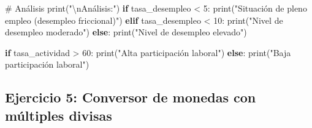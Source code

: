 \documentclass[
  doc,
  floatsintext,
  longtable,
  a4paper,
  nolmodern,
  notxfonts,
  notimes,
  12pt,
  colorlinks=true,linkcolor=blue,citecolor=blue,urlcolor=blue]{apa7}
\newenvironment{Shaded}{\begin{snugshade}}{\end{snugshade}}
\newcommand{\BuiltInTok}[1]{\textcolor[rgb]{0.00,0.23,0.31}{#1}}
\newcommand{\CharTok}[1]{\textcolor[rgb]{0.13,0.47,0.30}{#1}}
\newcommand{\CommentTok}[1]{\textcolor[rgb]{0.37,0.37,0.37}{#1}}
\newcommand{\ControlFlowTok}[1]{\textcolor[rgb]{0.00,0.23,0.31}{\textbf{#1}}}
\newcommand{\DecValTok}[1]{\textcolor[rgb]{0.68,0.00,0.00}{#1}}
\newcommand{\NormalTok}[1]{\textcolor[rgb]{0.00,0.23,0.31}{#1}}
\newcommand{\OperatorTok}[1]{\textcolor[rgb]{0.37,0.37,0.37}{#1}}
\newcommand{\StringTok}[1]{\textcolor[rgb]{0.13,0.47,0.30}{#1}}
\begin{document}
\begin{Shaded}
\begin{Highlighting}[]
\CommentTok{\# Análisis}
\BuiltInTok{print}\NormalTok{(}\StringTok{"}\CharTok{\textbackslash{}n}\StringTok{Análisis:"}\NormalTok{)}
\ControlFlowTok{if}\NormalTok{ tasa\_desempleo }\OperatorTok{\textless{}} \DecValTok{5}\NormalTok{:}
    \BuiltInTok{print}\NormalTok{(}\StringTok{"Situación de pleno empleo (desempleo friccional)"}\NormalTok{)}
\ControlFlowTok{elif}\NormalTok{ tasa\_desempleo }\OperatorTok{\textless{}} \DecValTok{10}\NormalTok{:}
    \BuiltInTok{print}\NormalTok{(}\StringTok{"Nivel de desempleo moderado"}\NormalTok{)}
\ControlFlowTok{else}\NormalTok{:}
    \BuiltInTok{print}\NormalTok{(}\StringTok{"Nivel de desempleo elevado"}\NormalTok{)}

\ControlFlowTok{if}\NormalTok{ tasa\_actividad }\OperatorTok{\textgreater{}} \DecValTok{60}\NormalTok{:}
    \BuiltInTok{print}\NormalTok{(}\StringTok{"Alta participación laboral"}\NormalTok{)}
\ControlFlowTok{else}\NormalTok{:}
    \BuiltInTok{print}\NormalTok{(}\StringTok{"Baja participación laboral"}\NormalTok{)}
\end{Highlighting}
\end{Shaded}

\subsection{Ejercicio 5: Conversor de monedas con múltiples
divisas}\label{ejercicio-5-conversor-de-monedas-con-muxfaltiples-divisas}
\end{document}
